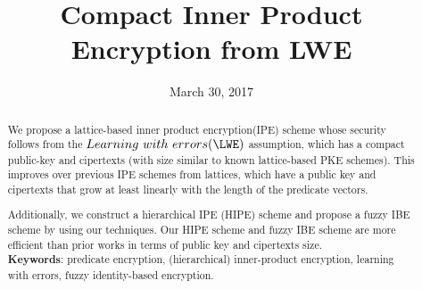 \documentclass[11pt,hidelinks]{article}
\begin{document}
\title{Compact Inner Product Encryption from LWE}%



\date{March 30, 2017}
\maketitle

\begin{abstract}
We propose a lattice-based inner product encryption(IPE) scheme whose security follows from the $Learning~with~errors (\LWE)$ assumption, which has a compact public-key and cipertexts (with size similar to known lattice-based PKE schemes). This improves over previous IPE schemes from lattices, which have a public key and cipertexts that grow at least linearly with the length of the predicate vectors.\

Additionally, we construct a hierarchical IPE (HIPE) scheme and propose a fuzzy IBE scheme by using our techniques. Our HIPE scheme and fuzzy IBE scheme are more efficient than prior works in terms of public key and cipertexts size.\\
\textbf{Keywords}: predicate encryption, (hierarchical) inner-product encryption, learning with errors, fuzzy identity-based encryption.
\end{abstract}
















\end{document}
